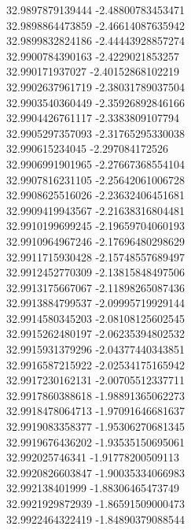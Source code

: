 {32.9897879139444	-2.48800783453471\\
32.9898864473859	-2.46614087635942\\
32.9899832824186	-2.44443928857274\\
32.9900784390163	-2.4229021853257\\
32.990171937027	-2.40152868102219\\
32.9902637961719	-2.38031789037504\\
32.9903540360449	-2.35926892846166\\
32.9904426761117	-2.3383809107794\\
32.9905297357093	-2.31765295330038\\
32.990615234045	-2.297084172526\\
32.9906991901965	-2.27667368554104\\
32.9907816231105	-2.25642061006728\\
32.9908625516026	-2.23632406451681\\
32.9909419943567	-2.21638316804481\\
32.9910199699245	-2.19659704060193\\
32.9910964967246	-2.17696480298629\\
32.9911715930428	-2.15748557689497\\
32.9912452770309	-2.13815848497506\\
32.9913175667067	-2.11898265087436\\
32.9913884799537	-2.09995719929144\\
32.9914580345203	-2.08108125602545\\
32.9915262480197	-2.06235394802532\\
32.9915931379296	-2.04377440343851\\
32.9916587215922	-2.02534175165942\\
32.9917230162131	-2.00705512337711\\
32.9917860388618	-1.98891365062273\\
32.9918478064713	-1.97091646681637\\
32.9919083358377	-1.95306270681345\\
32.9919676436202	-1.93535150695061\\
32.992025746341	-1.91778200509113\\
32.9920826603847	-1.90035334066983\\
32.992138401999	-1.88306465473749\\
32.9921929872939	-1.86591509000473\\
32.9922464322419	-1.84890379088544\\
}

